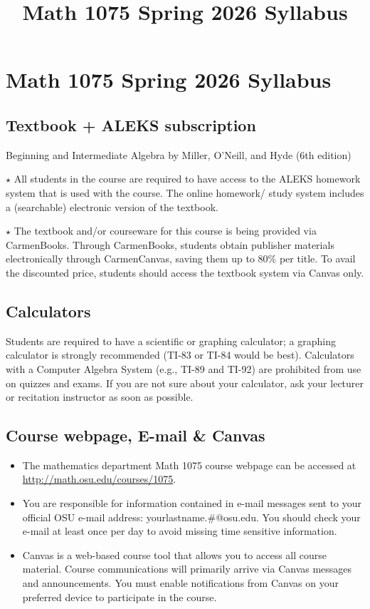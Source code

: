 \documentclass{ximera}
\title{Math 1075 Spring 2026 Syllabus}
\begin{document}
\section*{Math 1075 Spring 2026 Syllabus}

\subsection*{Textbook + ALEKS subscription}
Beginning and Intermediate Algebra by Miller, O'Neill, and Hyde (6th edition)

$\star$ All students in the course are required to have access to the ALEKS homework system that is used with the course. The online homework/ study system includes a (searchable) electronic version of the textbook.

$\star$ The textbook and/or courseware for this course is being provided via CarmenBooks. Through CarmenBooks, students obtain publisher materials electronically through CarmenCanvas, saving them up to $80 \%$ per title. To avail the discounted price, students should access the textbook system via Canvas only.

\subsection*{Calculators}
Students are required to have a scientific or graphing calculator; a graphing calculator is strongly recommended (TI-83 or TI-84 would be best). Calculators with a Computer Algebra System (e.g., TI-89 and TI-92) are prohibited from use on quizzes and exams. If you are not sure about your calculator, ask your lecturer or recitation instructor as soon as possible.

\subsection*{Course webpage, E-mail \& Canvas}
\begin{itemize}
  \item The mathematics department Math 1075 course webpage can be accessed at \href{http://math.osu.edu/courses/1075}{http://math.osu.edu/courses/1075}.
  \item You are responsible for information contained in e-mail messages sent to your official OSU e-mail address: yourlastname.\#@osu.edu. You should check your e-mail at least once per day to avoid missing time sensitive information.
  \item Canvas is a web-based course tool that allows you to access all course material. Course communications will primarily arrive via Canvas messages and announcements. You must enable notifications from Canvas on your preferred device to participate in the course.
\end{itemize}
\end{document}
